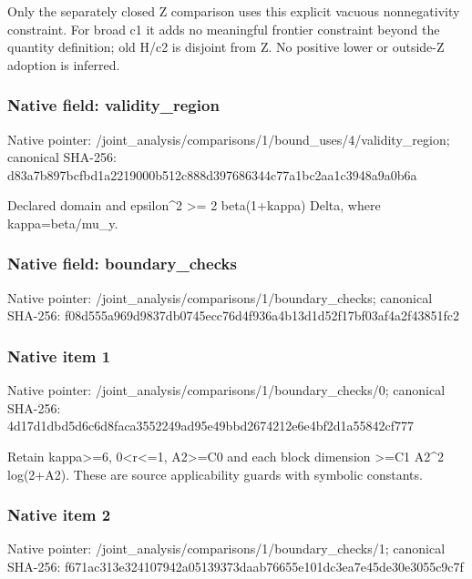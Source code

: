 \documentclass[10pt,a4paper]{article}
\begin{document}
\begingroup\raggedright\sloppy Only the separately closed Z comparison uses this explicit vacuous nonnegativity constraint. For broad c1 it adds no meaningful frontier constraint beyond the quantity definition;\allowbreak{} old H/\allowbreak{}c2 is disjoint from Z. No positive lower or outside-Z adoption is inferred.\par\endgroup

\subsubsection{Native field: validity\_\allowbreak{}region}
Native pointer: /joint\_\allowbreak{}analysis/comparisons/1/bound\_\allowbreak{}uses/4/validity\_\allowbreak{}region; canonical SHA-256: d83a7b897bcfbd1a2219000b512c888d397686344c77a1bc2aa1c3948a9a0b6a

\begingroup\raggedright\sloppy Declared domain and epsilon\textasciicircum{}2 >=\allowbreak{} 2 beta(1+kappa) Delta,\allowbreak{} where kappa=\allowbreak{}beta/\allowbreak{}mu\_\allowbreak{}y.\par\endgroup

\subsubsection{Native field: boundary\_\allowbreak{}checks}
Native pointer: /joint\_\allowbreak{}analysis/comparisons/1/boundary\_\allowbreak{}checks; canonical SHA-256: f08d555a969d9837db0745ecc76d4f936a4b13d1d52f17bf03af4a2f43851fc2

\subsubsection{Native item 1}
Native pointer: /joint\_\allowbreak{}analysis/comparisons/1/boundary\_\allowbreak{}checks/0; canonical SHA-256: 4d17d1dbd5d6c6d8faca3552249ad95e49bbd2674212e6e4bf2d1a55842cf777

\begingroup\raggedright\sloppy Retain kappa>=\allowbreak{}6,\allowbreak{} 0<r<=\allowbreak{}1,\allowbreak{} A2>=\allowbreak{}C0 and each block dimension >=\allowbreak{}C1 A2\textasciicircum{}2 log(2+A2). These are source applicability guards with symbolic constants.\par\endgroup

\subsubsection{Native item 2}
Native pointer: /joint\_\allowbreak{}analysis/comparisons/1/boundary\_\allowbreak{}checks/1; canonical SHA-256: f671ac313e324107942a05139373daab76655e101dc3ea7e45de30e3055c9c7f
\end{document}
